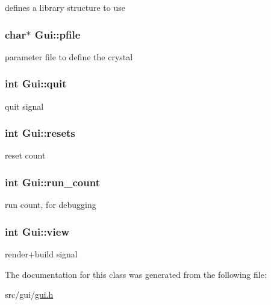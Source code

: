 defines a library structure to use 

\hypertarget{class_gui_ad78f3255742971f001f7c509c66ff655}{}
\subsubsection[{pfile}]{\setlength{\rightskip}{0pt plus 5cm}char$\ast$ Gui\+::pfile}\label{class_gui_ad78f3255742971f001f7c509c66ff655}


parameter file to define the crystal 

\hypertarget{class_gui_a218cd4709b84a4aa7110bbf43e050c3c}{}
\subsubsection[{quit}]{\setlength{\rightskip}{0pt plus 5cm}int Gui\+::quit}\label{class_gui_a218cd4709b84a4aa7110bbf43e050c3c}


quit signal 

\hypertarget{class_gui_a45506f3be90d2d61d0ec66205384e823}{}
\subsubsection[{resets}]{\setlength{\rightskip}{0pt plus 5cm}int Gui\+::resets}\label{class_gui_a45506f3be90d2d61d0ec66205384e823}


reset count 

\hypertarget{class_gui_a4140b79a0f551c7650ecb3a2571c1e83}{}
\subsubsection[{run\+\_\+count}]{\setlength{\rightskip}{0pt plus 5cm}int Gui\+::run\+\_\+count}\label{class_gui_a4140b79a0f551c7650ecb3a2571c1e83}


run count, for debugging 

\hypertarget{class_gui_a0ad7bdad878125b0c6a08949e572e109}{}
\subsubsection[{view}]{\setlength{\rightskip}{0pt plus 5cm}int Gui\+::view}\label{class_gui_a0ad7bdad878125b0c6a08949e572e109}


render+build signal 



The documentation for this class was generated from the following file\+:\begin{DoxyCompactItemize}
\item 
src/gui/\hyperlink{gui_8h}{gui.\+h}\end{DoxyCompactItemize}
